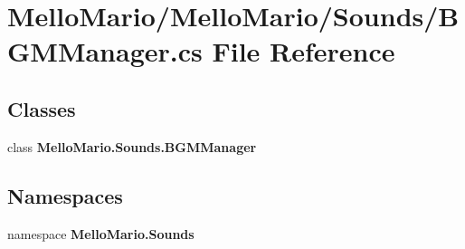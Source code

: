\section{Mello\+Mario/\+Mello\+Mario/\+Sounds/\+B\+G\+M\+Manager.cs File Reference}
\label{BGMManager_8cs}
\subsection*{Classes}
\begin{DoxyCompactItemize}
\item 
class \textbf{ Mello\+Mario.\+Sounds.\+B\+G\+M\+Manager}
\end{DoxyCompactItemize}
\subsection*{Namespaces}
\begin{DoxyCompactItemize}
\item 
namespace \textbf{ Mello\+Mario.\+Sounds}
\end{DoxyCompactItemize}
